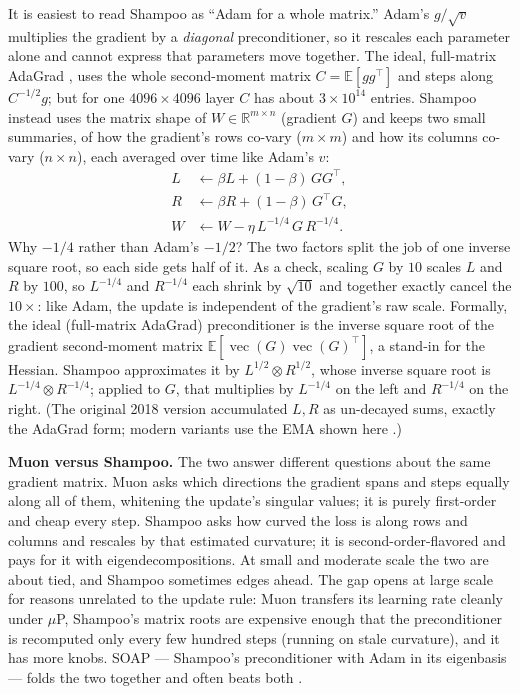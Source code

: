 \documentclass[10pt,conference]{IEEEtran}
\begin{document}
It is easiest to read Shampoo as ``Adam for a whole matrix.'' Adam's
$g/\sqrt{v}$ multiplies the gradient by a \emph{diagonal} preconditioner, so it
rescales each parameter alone and cannot express that parameters move together.
The ideal, full-matrix AdaGrad \cite{ref1}, uses the whole second-moment matrix
$C=\mathbb{E}[gg^\top]$ and steps along $C^{-1/2}g$; but for one $4096\times4096$
layer $C$ has about $3\times10^{14}$ entries. Shampoo instead uses the matrix
shape of $W\in\mathbb{R}^{m\times n}$ (gradient $G$) and keeps two small
summaries, of how the gradient's rows co-vary ($m\times m$) and how its columns
co-vary ($n\times n$), each averaged over time like Adam's $v$:
\begin{equation}
\begin{aligned}
L &\leftarrow \beta L + (1-\beta)\, G G^\top, \\
R &\leftarrow \beta R + (1-\beta)\, G^\top G, \\
W &\leftarrow W - \eta\, L^{-1/4}\, G\, R^{-1/4}.
\end{aligned}
\end{equation}
Why $-1/4$ rather than Adam's $-1/2$? The two factors split the job of one
inverse square root, so each side gets half of it. As a check, scaling $G$ by
$10$ scales $L$ and $R$ by $100$, so $L^{-1/4}$ and $R^{-1/4}$ each shrink by
$\sqrt{10}$ and together exactly cancel the $10\times$: like Adam, the update is
independent of the gradient's raw scale. Formally, the ideal
(full-matrix AdaGrad) preconditioner is the inverse square root of the gradient
second-moment matrix $\mathbb{E}[\operatorname{vec}(G)\operatorname{vec}(G)^\top]$,
a stand-in for the Hessian. Shampoo approximates it by $L^{1/2}\otimes R^{1/2}$,
whose inverse square root is $L^{-1/4}\otimes R^{-1/4}$; applied to $G$, that
multiplies by $L^{-1/4}$ on the left and $R^{-1/4}$ on the right. (The original 2018 version
accumulated $L,R$ as un-decayed sums, exactly the AdaGrad form; modern variants
use the EMA shown here \cite{ref8,ref9}.)

\textbf{Muon versus Shampoo.} The two answer different questions about the same
gradient matrix. Muon asks which directions the gradient spans and steps equally
along all of them, whitening the update's singular values; it is purely
first-order and cheap every step. Shampoo asks how curved the loss is along rows
and columns and rescales by that estimated curvature; it is second-order-flavored
and pays for it with eigendecompositions. At small and moderate scale the two are
about tied, and Shampoo sometimes edges ahead. The gap opens at large scale for
reasons unrelated to the update rule: Muon transfers its learning rate cleanly
under $\mu$P, Shampoo's matrix roots are expensive enough that the preconditioner
is recomputed only every few hundred steps (running on stale curvature), and it
has more knobs. SOAP --- Shampoo's preconditioner with Adam in its eigenbasis ---
folds the two together and often beats both \cite{ref9}.
\end{document}
